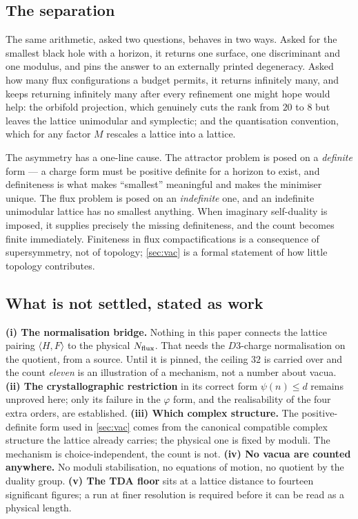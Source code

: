 \documentclass[11pt,a4paper]{article}
\theoremstyle{remark}
\begin{document}
\subsection*{The separation}

The same arithmetic, asked two questions, behaves in two ways. Asked for the smallest black hole with a horizon,
it returns one surface, one discriminant and one modulus, and pins the answer to an externally printed
degeneracy. Asked how many flux configurations a budget permits, it returns infinitely many, and keeps returning
infinitely many after every refinement one might hope would help: the orbifold projection, which genuinely cuts
the rank from $20$ to $8$ but leaves the lattice unimodular and symplectic; and the quantisation convention,
which for any factor $M$ rescales a lattice into a lattice.

The asymmetry has a one-line cause. The attractor problem is posed on a \emph{definite} form --- a charge form
must be positive definite for a horizon to exist, and definiteness is what makes ``smallest'' meaningful and
makes the minimiser unique. The flux problem is posed on an \emph{indefinite} one, and an indefinite unimodular
lattice has no smallest anything. When imaginary self-duality is imposed, it supplies precisely the missing
definiteness, and the count becomes finite immediately. Finiteness in flux compactifications is a consequence of
supersymmetry, not of topology; \cref{sec:vac} is a formal statement of how little topology contributes.

\subsection*{What is not settled, stated as work}

\begin{scopebox}
\textbf{(i) The normalisation bridge.} Nothing in this paper connects the lattice pairing $\langle H,F\rangle$ to
the physical $N_{\rm flux}$. That needs the $D3$-charge normalisation on the quotient, from a source. Until it is
pinned, the ceiling $32$ is carried over and the count \emph{eleven} is an illustration of a mechanism, not a
number about vacua. \textbf{(ii) The crystallographic restriction} in its correct form $\psi(n)\le d$ remains
unproved here; only its failure in the $\varphi$ form, and the realisability of the four extra orders, are
established. \textbf{(iii) Which complex structure.} The positive-definite form used in \cref{sec:vac} comes from
the canonical compatible complex structure the lattice already carries; the physical one is fixed by moduli. The
mechanism is choice-independent, the count is not. \textbf{(iv) No vacua are counted anywhere.} No moduli
stabilisation, no equations of motion, no quotient by the duality group. \textbf{(v) The TDA floor} sits at a
lattice distance to fourteen significant figures; a run at finer resolution is required before it can be read as
a physical length.
\end{scopebox}
\end{document}
